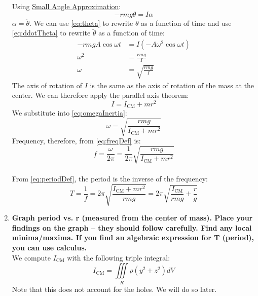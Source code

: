 \documentclass[article, 12pt]{article}
\begin{document}
\begin{enumerate}[1)]
    Using \hyperref[q:smallAngleApprox]{Small Angle Approximation}:
    \begin{equation}
        -rmg\theta = I\alpha
    \end{equation}
    $\alpha = \ddot{\theta}$. We can use \autoref{eq:theta} to rewrite $\theta$ as a function of time and use \autoref{eq:ddotTheta} to rewrite $\ddot{\theta}$ as a function of time:
    \begin{align}
        -rmgA\cos{\omega t} &= I(-A\omega^2 \cos{\omega t}) \nonumber\\
        \omega^2 &= \frac{rmg}{I} \nonumber\\
        \omega &= \sqrt{\frac{rmg}{I}}
        \label{eq:omegaInertia}
    \end{align}
    The axis of rotation of $I$ is the same as the axis of rotation of the mass at the center. We can therefore apply the parallel axis theorem:
    \begin{equation}
        I = I_\text{CM} + mr^2
        \label{eq:parallelAxis} 
    \end{equation}
    We substitute into \autoref{eq:omegaInertia}:
    \begin{equation}
        \omega = \sqrt{\frac{rmg}{I_\text{CM} + mr^2}}
    \end{equation}
    Frequency, therefore, from \autoref{eq:freqDef} is:
    \begin{equation}
        f = \frac{\omega}{2\pi} = \frac{1}{2\pi}{\sqrt{\frac{rmg}{I_\text{CM} + mr^2}}}
    \end{equation}
    \\
    From \autoref{eq:periodDef}, the period is the inverse of the frequency:
    \begin{equation}
        T = \frac{1}{f} = 2\pi\sqrt{\frac{I_\text{CM} + mr^2}{{rmg}}} = 2\pi\sqrt{\frac{I_\text{CM}}{rmg} + \frac{r}{g}}
        \label{eq:periodFunctionofR}
    \end{equation}
    \item \textbf{Graph period vs. r (measured from the center of mass). Place your findings on the graph -- they should follow carefully. Find any local minima/maxima. If you find an algebraic expression for T (period), you can use calculus.} \\
    We compute $I_\text{CM}$ with the following triple integral:
    \begin{equation}
        I_\text{CM} = \iiint \limits_{R} \rho (y^2 + z^2) dV
    \end{equation}
    Note that this does not account for the holes. We will do so later. \\

\end{enumerate}
\end{document}
